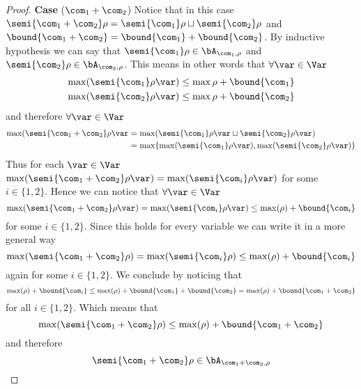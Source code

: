 \begin{proof}
  \noindent
  \textbf{Case} (\(\com_1 + \com_2\))
  Notice that in this case
  \(\semi{\com_1 + \com_2} \rho = \semi{\com_1}\rho \sqcup
  \semi{\com_2}\rho\) and
  \(\bound{\com_1 + \com_2} = \bound{\com_1} + \bound{\com_2}\). By
  inductive hypothesis we can say that
  \(\semi{\com_1}\rho \in \bA_{\com_1, \rho}\) and
  \(\semi{\com_2}\rho \in \bA_{\com_2, \rho}\). This means in other
  words that \(\forall \var \in \Var\)
  \begin{align*}
    \max(\semi{\com_1}\rho\var) & \leq \max{\rho} + \bound{\com_1} \\
    \max(\semi{\com_2}\rho\var) & \leq \max{\rho} + \bound{\com_2}
  \end{align*}
  and therefore \(\forall \var \in \Var\)
  \begin{align*}
    \max(\semi{\com_1 + \com_2} \rho \var & = \max(\semi{\com_1}\rho\var \sqcup \semi{\com_2}\rho\var) \\
                                          & = \max\{\max(\semi{\com_1}\rho\var), \max(\semi{\com_2}\rho\var)\}
  \end{align*}
  Thus for each \(\var \in\Var\)
  \(\max(\semi{\com_1 + \com_2}\rho\var) =
  \max(\semi{\com_i}\rho\var)\) for some \(i \in \{1,2\}\).  Hence we
  can notice that \(\forall \var\in\Var\)
  \begin{equation*}
    \max(\semi{\com_1 + \com_2}\rho\var) = \max(\semi{\com_i}\rho\var) \leq \max(\rho) + \bound{\com_i} 
  \end{equation*}
  for some \(i\in\{1,2\}\). Since this holds for every variable we can
  write it in a more general way
  \begin{equation*}
    \max(\semi{\com_1 + \com_2}\rho) = \max(\semi{\com_i}\rho) \leq \max(\rho) + \bound{\com_i} 
  \end{equation*}
  again for some \(i\in\{1,2\}\). We conclude by noticing that
  \begin{equation*}
    \max(\rho) + \bound{\com_i} \leq \max(\rho) + \bound{\com_1} + \bound{\com_2} = \max(\rho) + \bound{\com_1 + \com_2}
  \end{equation*}
  for all \(i \in \{1,2\}\). Which means that
  \begin{equation*}
    \max(\semi{\com_1 + \com_2}\rho) \leq \max(\rho) + \bound{\com_1 + \com_2}
  \end{equation*}
  and therefore
  \begin{equation*}
    \semi{\com_1 + \com_2} \rho \in \bA_{\com_1 + \com_2, \rho}
  \end{equation*}
  

\end{proof}
